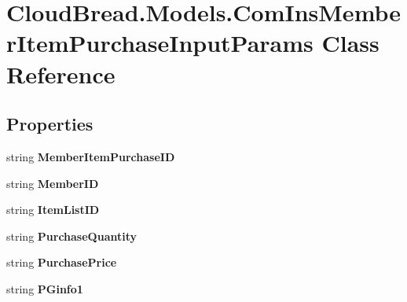 \hypertarget{a00051}{}\section{Cloud\+Bread.\+Models.\+Com\+Ins\+Member\+Item\+Purchase\+Input\+Params Class Reference}
\label{a00051}
\subsection*{Properties}
\begin{DoxyCompactItemize}
\item 
string {\bfseries Member\+Item\+Purchase\+ID}\hypertarget{a00051_aee2f4267120cf9719b80e82498948406}{}\label{a00051_aee2f4267120cf9719b80e82498948406}

\item 
string {\bfseries Member\+ID}\hypertarget{a00051_a1250afa0d5b8808633b0265f620e4c99}{}\label{a00051_a1250afa0d5b8808633b0265f620e4c99}

\item 
string {\bfseries Item\+List\+ID}\hypertarget{a00051_a5187a3316b757ae6af5665bed44abca8}{}\label{a00051_a5187a3316b757ae6af5665bed44abca8}

\item 
string {\bfseries Purchase\+Quantity}\hypertarget{a00051_ae434af24080aaaae9f401598cf2c0bfe}{}\label{a00051_ae434af24080aaaae9f401598cf2c0bfe}

\item 
string {\bfseries Purchase\+Price}\hypertarget{a00051_acc8edb60785c666a5e7a8d756834a1f4}{}\label{a00051_acc8edb60785c666a5e7a8d756834a1f4}

\item 
string {\bfseries P\+Ginfo1}\hypertarget{a00051_a35b6475415ccdfabed1a10cea27f8735}{}\label{a00051_a35b6475415ccdfabed1a10cea27f8735}


\end{DoxyCompactItemize}
